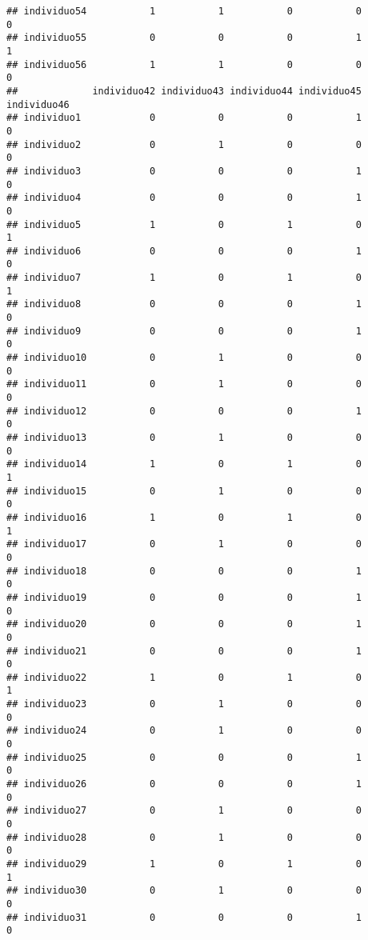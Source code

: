 \documentclass[
]{article}
\begin{document}
\begin{verbatim}
## individuo54           1           1           0           0           0
## individuo55           0           0           0           1           1
## individuo56           1           1           0           0           0
##             individuo42 individuo43 individuo44 individuo45 individuo46
## individuo1            0           0           0           1           0
## individuo2            0           1           0           0           0
## individuo3            0           0           0           1           0
## individuo4            0           0           0           1           0
## individuo5            1           0           1           0           1
## individuo6            0           0           0           1           0
## individuo7            1           0           1           0           1
## individuo8            0           0           0           1           0
## individuo9            0           0           0           1           0
## individuo10           0           1           0           0           0
## individuo11           0           1           0           0           0
## individuo12           0           0           0           1           0
## individuo13           0           1           0           0           0
## individuo14           1           0           1           0           1
## individuo15           0           1           0           0           0
## individuo16           1           0           1           0           1
## individuo17           0           1           0           0           0
## individuo18           0           0           0           1           0
## individuo19           0           0           0           1           0
## individuo20           0           0           0           1           0
## individuo21           0           0           0           1           0
## individuo22           1           0           1           0           1
## individuo23           0           1           0           0           0
## individuo24           0           1           0           0           0
## individuo25           0           0           0           1           0
## individuo26           0           0           0           1           0
## individuo27           0           1           0           0           0
## individuo28           0           1           0           0           0
## individuo29           1           0           1           0           1
## individuo30           0           1           0           0           0
## individuo31           0           0           0           1           0

\end{verbatim}
\end{document}
